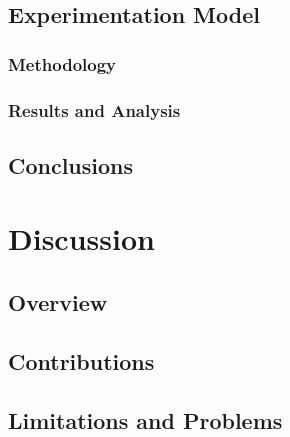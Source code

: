 \documentclass[cic,tc,english]{iiufrgs}
\begin{document}
\section{Experimentation Model}

\subsection{Methodology}

\subsection{Results and Analysis}

\section{Conclusions}




\chapter{Discussion}

\section{Overview}

\section{Contributions}

\section{Limitations and Problems}

\end{document}
